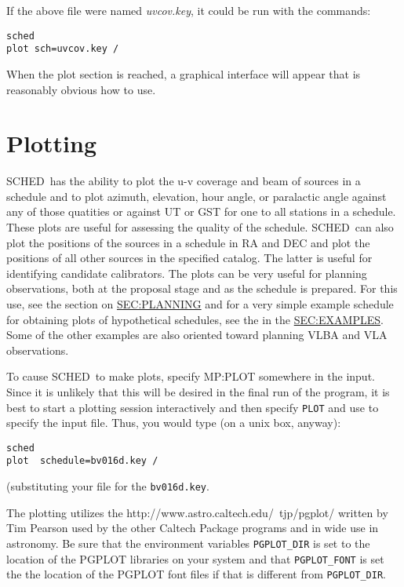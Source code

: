 \documentclass{report}
\newcommand{\schedb}{{\sc SCHED~}}
\begin{document}


If the above file were named {\sl uvcov.key}, it could be run with the
commands:
\begin{verbatim}
sched
plot sch=uvcov.key /
\end{verbatim}
When the plot section is reached, a graphical interface will appear
that is reasonably obvious how to use.



\section{\label{SEC:PLOT}Plotting}


\schedb has the ability to plot the u-v coverage and beam of sources in a
schedule and to plot azimuth, elevation, hour angle, or paralactic
angle against any of those quatities or against UT or GST for one to
all stations in a schedule.  These plots are useful for assessing the
quality of the schedule.  \schedb can also plot the positions of the
sources in a schedule in RA and DEC and plot the positions of all
other sources in the specified catalog.  The latter is useful for
identifying candidate calibrators.  The plots can be very useful
for planning observations, both at the proposal stage and as the
schedule is prepared.  For this use, see the section on
\hyperref{planning}{planning (Section }{)}{SEC:PLANNING} and for a
very simple example schedule for obtaining plots of hypothetical
schedules, see the  in the
\hyperref{Examples section.}{Examples Section
(Section}{).}{SEC:EXAMPLES}.  Some of the other examples are also
oriented toward planning VLBA and VLA observations.

To cause \schedb to make plots, specify  {MP:PLOT}
somewhere in the input.  Since it is unlikely that this will be
desired in the final run of the program, it is best to start a
plotting session interactively and then specify {\tt PLOT} and use
 to specify the input file.
Thus, you would type (on a unix box, anyway):

\begin{verbatim}
sched
plot  schedule=bv016d.key /
\end{verbatim}

(substituting your file for the {\tt bv016d.key}.

The plotting utilizes the  {http://www.astro.caltech.edu/~tjp/pgplot/} written by Tim
Pearson used by the other Caltech Package programs and in wide use in
astronomy.  Be sure that the environment variables {\tt PGPLOT\_DIR}
is set to the location of the {\sc PGPLOT} libraries on your system
and that {\tt PGPLOT\_FONT} is set the the location of the {\sc
PGPLOT} font files if that is different from {\tt PGPLOT\_DIR}.
\end{document}
